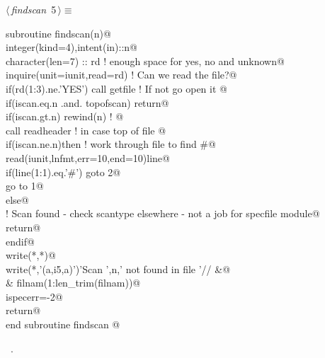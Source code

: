 \documentclass[10pt,a4paper,notitlepage]{article}
\begin{document}
\begin{flushleft} \small
\begin{minipage}{\linewidth}\label{scrap3}\raggedright\small
{} $\langle\,${\it findscan}\nobreak\ {\footnotesize {5}}$\,\rangle\equiv$
\vspace{-1ex}
\begin{list}{}{} \item
\mbox{}\verb@      subroutine findscan(n)@\\
\mbox{}\verb@      integer(kind=4),intent(in)::n@\\
\mbox{}\verb@      character(len=7) :: rd ! enough space for yes, no and unknown@\\
\mbox{}\verb@      inquire(unit=iunit,read=rd)        ! Can we read the file?@\\
\mbox{}\verb@      if(rd(1:3).ne.'YES') call getfile  ! If not go open it @\\
\mbox{}\verb@      if(iscan.eq.n .and. topofscan) return@\\
\mbox{}\verb@      if(iscan.gt.n) rewind(n) ! @\\
\mbox{}     call readheader ! in case top of file     @\\
\mbox{}\verb@      if(iscan.ne.n)then ! work through file to find #@\\
\mbox{}      read(iunit,lnfmt,err=10,end=10)line@\\
\mbox{}\verb@       if(line(1:1).eq.'#') goto 2@\\
\mbox{}\verb@       go to 1@\\
\mbox{}\verb@      else@\\
\mbox{}\verb@! Scan found - check scantype elsewhere - not a job for specfile module@\\
\mbox{}\verb@       return@\\
\mbox{}\verb@      endif@\\
\mbox{}    write(*,*)@\\
\mbox{}\verb@      write(*,'(a,i5,a)')'Scan ',n,' not found in file '//              &@\\
\mbox{}\verb@     & filnam(1:len_trim(filnam))@\\
\mbox{}\verb@      ispecerr=-2@\\
\mbox{}\verb@      return@\\
\mbox{}\verb@      end subroutine findscan                                                @{\NWsep}
\end{list}
\vspace{-1.5ex}
\footnotesize
\begin{list}{}{\setlength{\itemsep}{-\parsep}\setlength{\itemindent}{-\leftmargin}}
\item \NWtxtMacroRefIn\ .

\item{}
\end{list}
\end{minipage}\vspace{4ex}
\end{flushleft}
\end{document}
